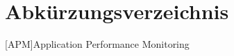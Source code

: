 \chapter*{Abkürzungsverzeichnis} 

\begin{acronym}
	
	[APM]{Application Performance Monitoring}
	
\end{acronym}